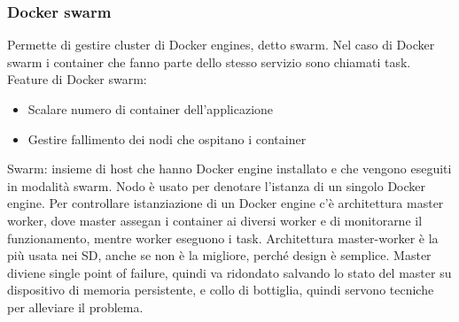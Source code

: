\documentclass[16px]{article}
\begin{document}
\subsubsection{Docker swarm}
Permette di gestire cluster di Docker engines, detto swarm. Nel caso di Docker swarm i container che fanno parte dello stesso servizio sono chiamati task. Feature di Docker swarm:
\begin{itemize}
\item Scalare numero di container dell'applicazione
\item Gestire fallimento dei nodi che ospitano i container
\end{itemize}
Swarm: insieme di host che hanno Docker engine installato e che vengono eseguiti in modalità swarm. Nodo è usato per denotare l'istanza di un singolo Docker engine. Per controllare istanziazione di un Docker engine c'è architettura master worker, dove master assegan i container ai diversi worker e di monitorarne il funzionamento, mentre worker eseguono i task. Architettura master-worker è la più usata nei SD, anche se non è la migliore, perché design è semplice. Master diviene single point of failure, quindi va ridondato salvando lo stato del master su dispositivo di memoria persistente, e collo di bottiglia, quindi servono tecniche per alleviare il problema.
\end{document}
